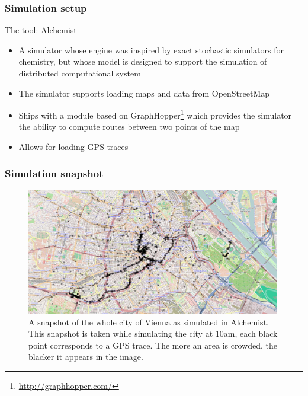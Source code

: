 \documentclass[presentation]{beamer}
\begin{document}
\begin{frame}\frametitle{Simulation setup}
  \begin{block}{The tool: Alchemist}
    \begin{itemize}
     \item A simulator whose engine was inspired by exact stochastic simulators for chemistry, but whose model is designed to support the simulation of distributed computational system \cite{alchemist-jos2013}
     \item The simulator supports loading maps and data from OpenStreetMap \cite{osm}
     \item Ships with a module based on GraphHopper\footnote{\url{http://graphhopper.com/}} which provides the simulator the ability to compute routes between two points of the map
     \item Allows for loading GPS traces
    \end{itemize}
  \end{block}
\end{frame}

\begin{frame}\frametitle{Simulation snapshot}
  \begin{figure}
    \includegraphics[width=0.99\textwidth]{img/vienna}
    \caption{A snapshot of the whole city of Vienna as simulated in Alchemist. This snapshot is taken while simulating the city at 10am, each black point corresponds to a GPS trace. The more an area is crowded, the blacker it appears in the image.}
    \label{img:vienna}
  \end{figure}
\end{frame}
\end{document}
